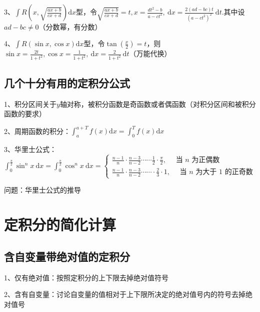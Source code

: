 3、$ \int R\left(x, \sqrt{\frac{a x+b}{c x+d}}\right) \mathrm{d} x $型，令$ \sqrt{\frac{a x+b}{c x+d}}=t, x=\frac{d t^{2}-b}{a-c t^{2}}, \mathrm{~d} x=\frac{2(a d-b c) t}{\left(a-c t^{2}\right)^{2}} \mathrm{~d} t . $其中设$ a d-b c \neq 0 $（分数幂，有分数）

4、$ \int R(\sin x, \cos x) \mathrm{d} x $型，令$ \tan({\frac{x}{2}})=t $，则$ \sin x=\frac{2 t}{1+t^{2}}, \cos x=\frac{1}{1+t^{2}}, \mathrm{~d} x=\frac{2}{1+t^{2}} \mathrm{~d} t $（万能代换）



\subsection{几个十分有用的定积分公式}

1、积分区间关于$ y $轴对称，被积分函数是奇函数或者偶函数（对积分区间和被积分函数的要求）

2、周期函数的积分：$ \int_{a}^{a+T} f(x) \mathrm{d} x=\int_{0}^{T} f(x) \mathrm{d} x $

3、华里士公式：$ \int_{0}^{\frac{\pi}{2}} \sin ^{n} x \mathrm{~d} x=\int_{0}^{\frac{\pi}{2}} \cos ^{n} x \mathrm{~d} x=\left\{\begin{array}{l}\frac{n-1}{n} \cdot \frac{n-3}{n-2} \cdots \cdots \frac{1}{2} \cdot \frac{\pi}{2}, \quad \text { 当 } n \text { 为正偶数 } \\\frac{n-1}{n} \cdot \frac{n-3}{n-2} \cdots \cdots \cdot \frac{2}{3} \cdot 1, \quad \text { 当 } n \text { 为大于 } 1 \text { 的正奇数 }\end{array}\right. $

问题：华里士公式的推导

\section{定积分的简化计算}



\subsection{含自变量带绝对值的定积分}

1、仅有绝对值：按照定积分的上下限去掉绝对值符号

2、含有自变量：讨论自变量的值相对于上下限所决定的绝对值号内的符号去掉绝对值号



